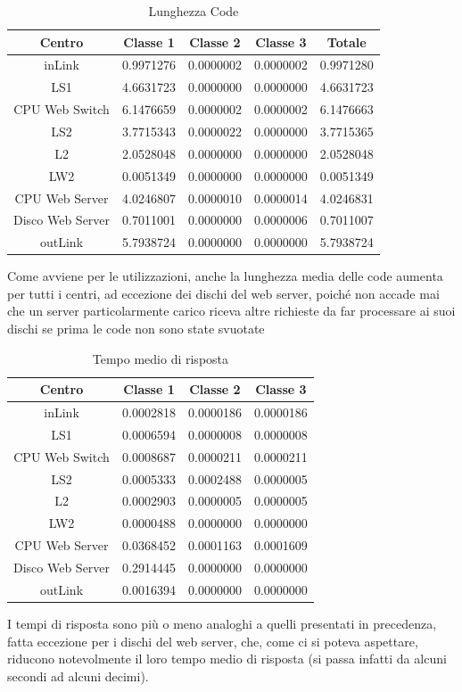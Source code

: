 \begin{table}[htbp]
\begin{center}
\begin{tabular}{|c|c|c|c|c|}
\hline
Centro	&Classe 1	&Classe 2	&Classe 3	&Totale\\
\hline
\hline
inLink & 0.9971276 & 0.0000002 & 0.0000002 & 0.9971280 \\ \hline
LS1 & 4.6631723 & 0.0000000 & 0.0000000 & 4.6631723 \\ \hline
CPU Web Switch & 6.1476659 & 0.0000002 & 0.0000002 & 6.1476663 \\ \hline
LS2 & 3.7715343 & 0.0000022 & 0.0000000 & 3.7715365 \\ \hline
L2 & 2.0528048 & 0.0000000 & 0.0000000 & 2.0528048 \\ \hline
LW2 & 0.0051349 & 0.0000000 & 0.0000000 & 0.0051349 \\ \hline
CPU Web Server & 4.0246807 & 0.0000010 & 0.0000014 & 4.0246831 \\ \hline
Disco Web Server & 0.7011001 & 0.0000000 & 0.0000006 & 0.7011007 \\ \hline
outLink & 5.7938724 & 0.0000000 & 0.0000000 & 5.7938724 \\ \hline
\end{tabular}
\end{center}
\caption{Lunghezza Code}
\label{lunghezzacode}
\end{table}
Come avviene per le utilizzazioni, anche la lunghezza media delle code aumenta per tutti i centri, ad eccezione dei dischi del web server, poiché non accade mai che un server particolarmente carico riceva altre richieste da far processare ai suoi dischi se prima le code non sono state svuotate
\begin{table}[htbp]
\begin{center}
\begin{tabular}{|c|c|c|c|}
\hline
Centro	&Classe 1	&Classe 2	&Classe 3\\
\hline
\hline
inLink & 0.0002818 & 0.0000186 & 0.0000186 \\ \hline
LS1 & 0.0006594 & 0.0000008 & 0.0000008 \\ \hline
CPU Web Switch & 0.0008687 & 0.0000211 & 0.0000211 \\ \hline
LS2 & 0.0005333 & 0.0002488 & 0.0000005 \\ \hline
L2 & 0.0002903 & 0.0000005 & 0.0000005 \\ \hline
LW2 & 0.0000488 & 0.0000000 & 0.0000000 \\ \hline
CPU Web Server & 0.0368452 & 0.0001163 & 0.0001609 \\ \hline
Disco Web Server & 0.2914445 & 0.0000000 & 0.0000000 \\ \hline
outLink & 0.0016394 & 0.0000000 & 0.0000000 \\ \hline
\end{tabular}
\end{center}
\caption{Tempo medio di risposta}
\label{tempomediodirisposta}
\end{table}
I tempi di risposta sono più o meno analoghi a quelli presentati in precedenza, fatta eccezione per i dischi del web server, che, come ci si poteva aspettare, riducono notevolmente il loro tempo medio di risposta (si passa infatti da alcuni secondi ad alcuni decimi).
